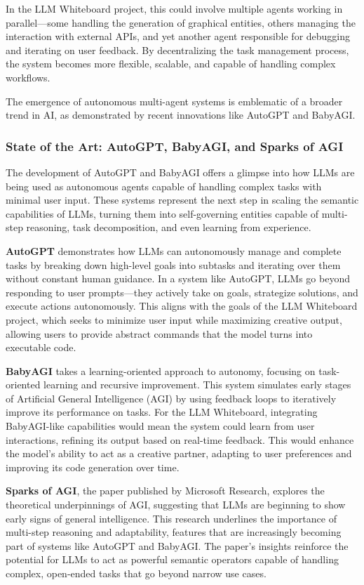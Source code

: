 In the LLM Whiteboard project, this could involve multiple agents working in parallel—some handling the generation of graphical entities, others managing the interaction with external APIs, and yet another agent responsible for debugging and iterating on user feedback.
By decentralizing the task management process, the system becomes more flexible, scalable, and capable of handling complex workflows.

The emergence of autonomous multi-agent systems is emblematic of a broader trend in AI, as demonstrated by recent innovations like AutoGPT and BabyAGI.

\subsubsection{State of the Art: AutoGPT, BabyAGI, and Sparks of AGI}
The development of AutoGPT and BabyAGI offers a glimpse into how LLMs are being used as autonomous agents capable of handling complex tasks with minimal user input.
These systems represent the next step in scaling the semantic capabilities of LLMs, turning them into self-governing entities capable of multi-step reasoning, task decomposition, and even learning from experience.

\textbf{AutoGPT} demonstrates how LLMs can autonomously manage and complete tasks by breaking down high-level goals into subtasks and iterating over them without constant human guidance.
In a system like AutoGPT, LLMs go beyond responding to user prompts—they actively take on goals, strategize solutions, and execute actions autonomously.
This aligns with the goals of the LLM Whiteboard project, which seeks to minimize user input while maximizing creative output, allowing users to provide abstract commands that the model turns into executable code.

\textbf{BabyAGI} takes a learning-oriented approach to autonomy, focusing on task-oriented learning and recursive improvement.
This system simulates early stages of Artificial General Intelligence (AGI) by using feedback loops to iteratively improve its performance on tasks.
For the LLM Whiteboard, integrating BabyAGI-like capabilities would mean the system could learn from user interactions, refining its output based on real-time feedback.
This would enhance the model's ability to act as a creative partner, adapting to user preferences and improving its code generation over time.

\textbf{Sparks of AGI}, the paper published by Microsoft Research, explores the theoretical underpinnings of AGI, suggesting that LLMs are beginning to show early signs of general intelligence.
This research underlines the importance of multi-step reasoning and adaptability, features that are increasingly becoming part of systems like AutoGPT and BabyAGI.
The paper's insights reinforce the potential for LLMs to act as powerful semantic operators capable of handling complex, open-ended tasks that go beyond narrow use cases.

